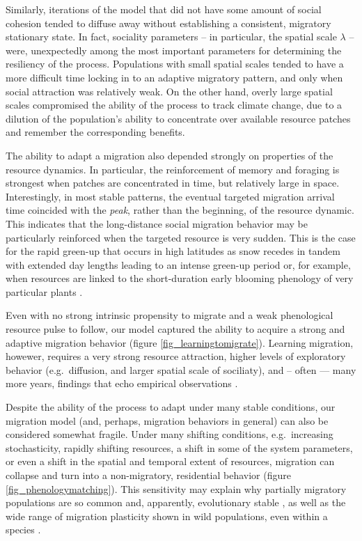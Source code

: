\documentclass[utf8]{frontiersSCNS} %
\begin{document}
	Similarly, iterations of the model that did not have some amount of social cohesion tended to diffuse away without establishing a consistent, migratory stationary state. In fact, sociality parameters -- in particular, the spatial scale $\lambda$ -- were, unexpectedly among the most important parameters for determining the resiliency of the process. Populations with small spatial scales tended to have a more difficult time locking in to an adaptive migratory pattern, and only when social attraction was relatively weak. On the other hand, overly large spatial scales compromised the ability of the process to track climate change, due to a dilution of the population's ability to concentrate over available resource patches and remember the corresponding benefits.  
	
	The ability to adapt a migration also depended strongly on properties of the resource dynamics. In particular, the reinforcement of memory and foraging is strongest when patches are concentrated in time, but relatively large in space. Interestingly, in most stable patterns, the eventual targeted migration arrival time coincided with the \emph{peak}, rather than the beginning, of the resource dynamic. This indicates that the long-distance social migration behavior may be particularly reinforced when the targeted resource is very sudden. This is the case for the rapid green-up that occurs in high latitudes as snow recedes in tandem with extended day lengths leading to an intense green-up period \citep{Park2020} or, for example, when resources are linked to the short-duration early blooming phenology of very particular plants \citep{Post2007, Renner2018}. 
	
	Even with no strong intrinsic propensity to migrate and a weak phenological resource pulse to follow, our model captured the ability to acquire a strong and adaptive migration behavior (figure \ref{fig_learningtomigrate}).  Learning migration, howewer, requires a very strong resource attraction, higher levels of exploratory behavior (e.g.~diffusion, and larger spatial scale of sociliaty), and -- often --- many more years, findings that echo empirical observations \citep{Jesmer2018}. 
	
	Despite the ability of the process to adapt under many stable conditions, our migration model (and, perhaps, migration behaviors in general) can also be considered somewhat fragile. Under many shifting conditions, e.g.~increasing stochasticity, rapidly shifting resources, a shift in some of the system parameters, or even a shift in the spatial and temporal extent of resources, migration can collapse and turn into a non-migratory, residential behavior (figure \ref{fig_phenologymatching}). This sensitivity may explain why partially migratory populations are so common and, apparently, evolutionary stable \citep{Berthold1999, Chapman2011}, as well as the wide range of migration plasticity shown in wild populations, even within a species \citep{Xu2021}.\\
	
\end{document}

